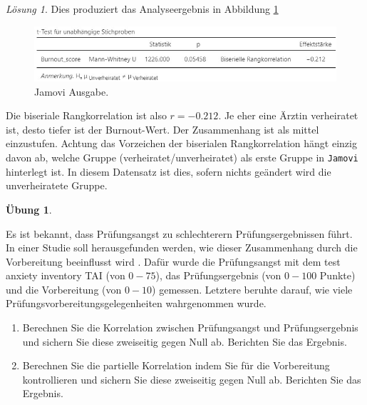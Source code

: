 \documentclass[
]{book}
\providecommand{\tightlist}{%
  \setlength{\itemsep}{0pt}\setlength{\parskip}{0pt}}
\theoremstyle{definition}
\theoremstyle{definition}
\theoremstyle{definition}
\newtheorem{exercise}{Übung}[chapter]
\theoremstyle{definition}
\theoremstyle{remark}
\newtheorem*{solution}{Lösung}
\begin{document}
\begin{solution}
Dies produziert das Analyseergebnis in Abbildung \ref{fig:sol-ehe-burnout-rankcorrelation-output}

\begin{figure}
\centering
\includegraphics{figures/08-exr-ehe-burnout-pointcorrelation-jmv-output3.jpg}
\caption{\label{fig:sol-ehe-burnout-rankcorrelation-output}Jamovi Ausgabe.}
\end{figure}

Die biseriale Rangkorrelation ist also \(r = -0.212\). Je eher eine Ärztin verheiratet ist, desto tiefer ist der Burnout-Wert. Der Zusammenhang ist als mittel einzustufen. Achtung das Vorzeichen der biserialen Rangkorrelation hängt einzig davon ab, welche Gruppe (verheiratet/unverheiratet) als erste Gruppe in \texttt{Jamovi} hinterlegt ist. In diesem Datensatz ist dies, sofern nichts geändert wird die unverheiratete Gruppe.

\end{solution}

\begin{exercise}
\protect\hypertarget{exr:test-preparation}{}\label{exr:test-preparation}\leavevmode

Es ist bekannt, dass Prüfungsangst zu schlechterern Prüfungsergebnissen führt. In einer Studie soll herausgefunden werden, wie dieser Zusammenhang durch die Vorbereitung beeinflusst wird \citep{yusefzadeh2019}. Dafür wurde die Prüfungsangst mit dem test anxiety inventory TAI (von \(0-75\)), das Prüfungsergebnis (von \(0-100\) Punkte) und die Vorbereitung (von \(0-10\)) gemessen. Letztere beruhte darauf, wie viele Prüfungsvorbereitungsgelegenheiten wahrgenommen wurde.

\begin{enumerate}
\def\labelenumi{\alph{enumi})}
\tightlist
\item
  Berechnen Sie die Korrelation zwischen Prüfungsangst und Prüfungsergebnis und sichern Sie diese zweiseitig gegen Null ab. Berichten Sie das Ergebnis.
\item
  Berechnen Sie die partielle Korrelation indem Sie für die Vorbereitung kontrollieren und sichern Sie diese zweiseitig gegen Null ab. Berichten Sie das Ergebnis.
\end{enumerate}

\end{exercise}
\end{document}
